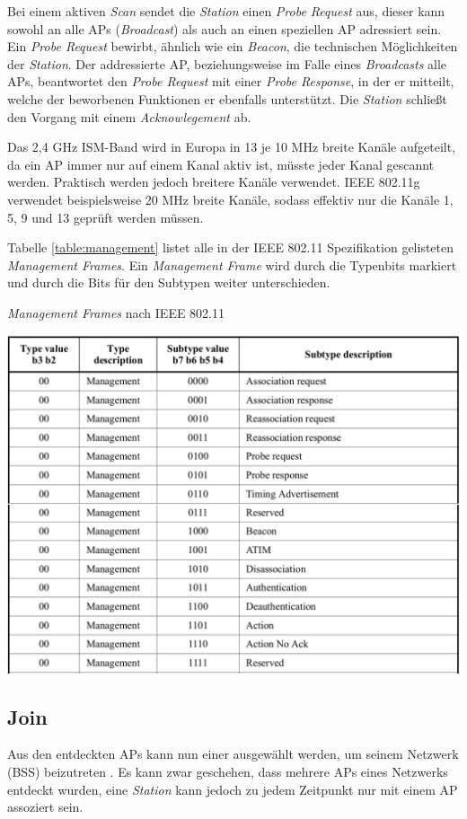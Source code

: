 Bei einem aktiven \emph{Scan} sendet die \emph{Station} einen \emph{Probe Request} aus, dieser kann sowohl an alle APs (\emph{Broadcast}) als auch an einen speziellen AP adressiert sein.
Ein \emph{Probe Request} bewirbt, ähnlich wie ein \emph{Beacon}, die technischen Möglichkeiten der \emph{Station}.
Der addressierte AP, beziehungsweise im Falle eines \emph{Broadcasts} alle APs, beantwortet den \emph{Probe Request} mit einer \emph{Probe Response}, in der er mitteilt, welche der beworbenen Funktionen er ebenfalls unterstützt. 
Die \emph{Station} schließt den Vorgang mit einem \emph{Acknowlegement} ab. 

Das 2,4 GHz ISM-Band wird in Europa in 13 je 10 MHz breite Kanäle aufgeteilt, da ein AP immer nur auf einem Kanal aktiv ist, müsste jeder Kanal gescannt werden.
Praktisch werden jedoch breitere Kanäle verwendet. 
IEEE 802.11g verwendet beispielsweise 20 MHz breite Kanäle, sodass effektiv nur die Kanäle 1, 5, 9 und 13 geprüft werden müssen. 

Tabelle \ref{table:management} listet alle in der IEEE 802.11 Spezifikation gelisteten \emph{Management Frames}.
Ein \emph{Management Frame} wird durch die Typenbits markiert und durch die Bits für den Subtypen weiter unterschieden.

\begin{table}[h]
	\centering
	\caption{\emph{Management Frames} nach IEEE 802.11 \cite{ieee2012management}}
	\label{table:management}
\includegraphics[width=\textwidth]{images/managementframes.png}
\end{table}

\subsection{Join}
Aus den entdeckten APs kann nun einer ausgewählt werden, um seinem Netzwerk (BSS) beizutreten \cite{ieee2012join}.
Es kann zwar geschehen, dass mehrere APs eines Netzwerks entdeckt wurden, eine \emph{Station} kann jedoch zu jedem Zeitpunkt nur mit einem AP assoziert sein. 

